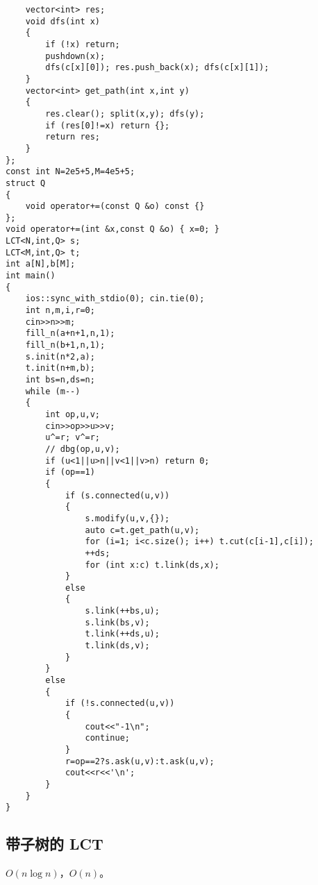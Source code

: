 \documentclass[12pt]{ctexart}
\begin{document}
\begin{lstlisting}
	vector<int> res;
	void dfs(int x)
	{
		if (!x) return;
		pushdown(x);
		dfs(c[x][0]); res.push_back(x); dfs(c[x][1]);
	}
	vector<int> get_path(int x,int y)
	{
		res.clear(); split(x,y); dfs(y);
		if (res[0]!=x) return {};
		return res;
	}
};
const int N=2e5+5,M=4e5+5;
struct Q
{
	void operator+=(const Q &o) const {}
};
void operator+=(int &x,const Q &o) { x=0; }
LCT<N,int,Q> s;
LCT<M,int,Q> t;
int a[N],b[M];
int main()
{
	ios::sync_with_stdio(0); cin.tie(0);
	int n,m,i,r=0;
	cin>>n>>m;
	fill_n(a+n+1,n,1);
	fill_n(b+1,n,1);
	s.init(n*2,a);
	t.init(n+m,b);
	int bs=n,ds=n;
	while (m--)
	{
		int op,u,v;
		cin>>op>>u>>v;
		u^=r; v^=r;
		// dbg(op,u,v);
		if (u<1||u>n||v<1||v>n) return 0;
		if (op==1)
		{
			if (s.connected(u,v))
			{
				s.modify(u,v,{});
				auto c=t.get_path(u,v);
				for (i=1; i<c.size(); i++) t.cut(c[i-1],c[i]);
				++ds;
				for (int x:c) t.link(ds,x);
			}
			else
			{
				s.link(++bs,u);
				s.link(bs,v);
				t.link(++ds,u);
				t.link(ds,v);
			}
		}
		else
		{
			if (!s.connected(u,v))
			{
				cout<<"-1\n";
				continue;
			}
			r=op==2?s.ask(u,v):t.ask(u,v);
			cout<<r<<'\n';
		}
	}
}
\end{lstlisting}


\subsection{带子树的 LCT}

$O(n\log n)$，$O(n)$。
\end{document}
